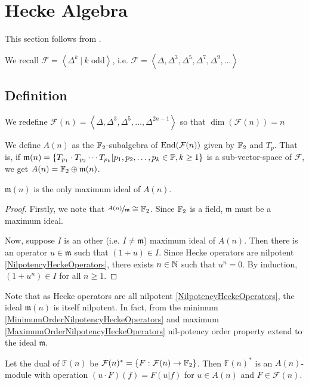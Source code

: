 \section{Hecke Algebra}
This section follows from \cite{StructureAlgebreHecke}.

We recall $\mathcal{F} = \left\langle \Delta^k \ | \ k \text{ odd} \right\rangle$, i.e. $\mathcal{F} = \left\langle \Delta, \Delta^3, \Delta^5, \Delta^7, \Delta^9, \dots \right\rangle$
\subsection{Definition}
We redefine $ \mathcal{F}(n) = \left\langle \Delta, \Delta^3, \Delta^5, \dots, \Delta^{2n-1} \right\rangle $ so that $\dim(\mathcal{F}(n)) = n$

We define $A(n)$ as the $\mathbb{F}_2$-subalgebra of $\text{End}(\mathcal{F}(n))$ given by $\mathbb{F}_2$ and $T_p$. That is, if 
$
\mathfrak{m}(n) = \{T_{p_1} \cdot T_{p_2} \cdots T_{p_k} | p_1, p_2, \dots, p_k \in \mathbb{P}, k\geq 1\}
$
is a sub-vector-space of $\mathcal{F}$, we get $A(n) = \mathbb{F}_2 \oplus \mathfrak{m}(n)$.

\begin{property}
	$\mathfrak{m}(n)$ is the only maximum ideal of $A(n)$.
\end{property}
\begin{proof}
	Firstly, we note that $\nicefrac{A(n)}{\mathfrak{m}} \cong \mathbb{F}_2$.
	Since $\mathbb{F}_2$ is a field, $\mathfrak{m}$ must be a maximum ideal.
	
	Now, suppose $I$ is an other (i.e. $I \neq \mathfrak{m}$) maximum ideal of $A(n)$.
	Then there is an operator $u \in \mathfrak{m}$ such that $(1+u) \in I$.
	Since Hecke operators are nilpotent \ref{NilpotencyHeckeOperators}, there exists $n \in \mathbb{N}$ such that $u^n=0$.
	By induction, $(1+u^n) \in I$ for all $n \geq 1$.
\end{proof}

Note that as Hecke operators are all nilpotent \ref{NilpotencyHeckeOperators}, the ideal $\mathfrak{m}(n)$ is itself nilpotent.
In fact, from the minimum \ref{MinimumOrderNilpotencyHeckeOperators} and maximum \ref{MaximumOrderNilpotencyHeckeOperators} nil-potency order property extend to the ideal $\mathfrak{m}$.

Let the dual of $\mathbb{F}(n)$ be $\mathcal{F}(n)^* = \{ F: \mathcal{F}(n) \to \mathbb{F}_2 \}$.
Then $\mathbb{F}(n)^*$ is an $A(n)$-module with operation 
$ (u \cdot F)(f) = F(u | f) $ for $u \in A(n)$ and $F \in \mathcal{F}(n)$.

